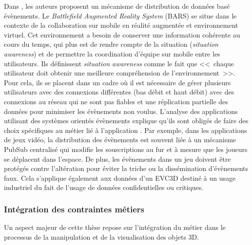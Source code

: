 %
Dans \cite{Brown2003}, les auteurs proposent un mécanisme de distribution de 
données basé évènements. Le \textit{Battlefield Augmented Reality System} 
(BARS) se situe dans le contexte de la collaboration sur mobile en réalité 
augmentée et environnement virtuel. Cet environnement a besoin de conserver 
une information cohérente au cours du temps, qui plus est de rendre compte de la 
situation (\textit{situation awareness}) et de permettre la coordination d'équipe sur 
mobile entre les utilisateurs. Ils définissent \textit{situation awareness} comme le 
fait que <<~chaque utilisateur doit obtenir une meilleure compréhension de 
l'environnement~>>. Pour cela, ils se placent dans un cadre où il est nécessaire 
de gérer plusieurs utilisateurs avec des connexions différentes (bas débit et haut 
débit) avec des connexions au réseau qui ne sont pas fiables et une réplication 
partielle des données pour minimiser les évènements non voulus.
 L'analyse des applications utilisant des systèmes orientés évènements explique 
qu'ils sont obligés de faire des choix spécifiques au métier lié à l'application 
\cite{Hinze2009}. Par exemple, dans les applications de jeux vidéo, la distribution 
des évènements est souvent liée à un mécanisme \gls{PubSub} centralisé qui 
modifie les souscriptions au fur et à mesure que les joueurs se déplacent dans 
l'espace. De plus, les évènements dans un jeu doivent être protégés contre 
l'altération pour éviter la triche ou la dissémination d'évènements faux. Cela 
s'applique également aux données d'un \gls{EVC3D} destiné à un usage industriel 
du fait de l'usage de données confidentielles ou critiques.

\subsubsection{Intégration des contraintes métiers}
Un aspect majeur de cette thèse repose sur l'intégration du métier dans le 
processus de la manipulation et de la visualisation des objets 3D.
